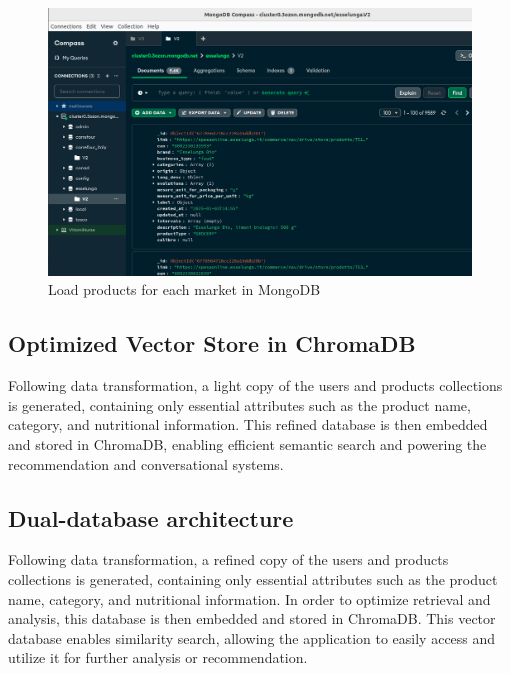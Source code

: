 \begin{center}
\begin{figure}[H]
    \includegraphics[scale=0.35]{images/load_data.png}
    \caption{Load products for each market in MongoDB} 
    \label{fig:load_data_mongo}
\end{figure}
\end{center}

\subsection{Optimized Vector Store in ChromaDB}
Following data transformation, a light copy of the users and products collections is generated, containing only essential attributes such as the product name, category, and nutritional information. This refined database is then embedded and stored in ChromaDB, enabling efficient semantic search and powering the recommendation and conversational systems.



\subsection{Dual-database architecture}
 
Following data transformation, a refined copy of the users and products
collections is generated, containing only essential attributes such as
the product name, category, and nutritional information. In order to
optimize retrieval and analysis, this database is then embedded and
stored in ChromaDB. This vector database enables similarity search,
allowing the application to easily access and utilize it for further analysis or recommendation.

